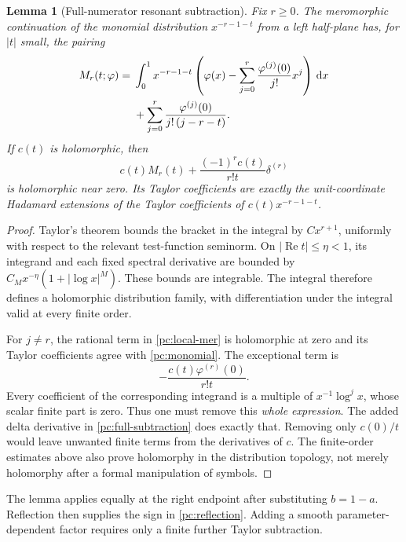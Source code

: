 \documentclass[11pt,a4paper]{article}
\numberwithin{equation}{section}
\newtheorem{lemma}[theorem]{Lemma}
\theoremstyle{definition}
\newcommand{\dd}{\,\mathrm d}
\newcommand{\Rea}{\operatorname{Re}}
\begin{document}
\begin{lemma}[Full-numerator resonant subtraction]\label{pc:local-lemma}
Fix $r\ge0$. The meromorphic continuation of the monomial distribution $x^{-r-1-t}$ from a left half-plane has, for $|t|$ small, the pairing
\begin{align}
M_r(t;\varphi)={}&\int_0^1x^{-r-1-t}
\left(\varphi(x)-\sum_{j=0}^r\frac{\varphi^{(j)}(0)}{j!}x^j\right)\dd x\notag\\
&+\sum_{j=0}^r\frac{\varphi^{(j)}(0)}{j!\,(j-r-t)}.\label{pc:local-mer}
\end{align}
If $c(t)$ is holomorphic, then
\begin{equation}\label{pc:full-subtraction}
c(t)M_r(t)+\frac{(-1)^r c(t)}{r!t}\delta^{(r)}
\end{equation}
is holomorphic near zero. Its Taylor coefficients are exactly the unit-coordinate Hadamard extensions of the Taylor coefficients of $c(t)x^{-r-1-t}$.
\end{lemma}
\begin{proof}
Taylor's theorem bounds the bracket in the integral by $C x^{r+1}$, uniformly with respect to the relevant test-function seminorm. On $|\Rea t|\le\eta<1$, its integrand and each fixed spectral derivative are bounded by $C_Mx^{-\eta}(1+|\log x|^M)$. These bounds are integrable. The integral therefore defines a holomorphic distribution family, with differentiation under the integral valid at every finite order.

For $j\ne r$, the rational term in \eqref{pc:local-mer} is holomorphic at zero and its Taylor coefficients agree with \eqref{pc:monomial}. The exceptional term is
\[
-\frac{c(t)\varphi^{(r)}(0)}{r!t}.
\]
Every coefficient of the corresponding integrand is a multiple of $x^{-1}\log^j x$, whose scalar finite part is zero. Thus one must remove this \emph{whole expression}. The added delta derivative in \eqref{pc:full-subtraction} does exactly that. Removing only $c(0)/t$ would leave unwanted finite terms from the derivatives of $c$. The finite-order estimates above also prove holomorphy in the distribution topology, not merely holomorphy after a formal manipulation of symbols.
\end{proof}
The lemma applies equally at the right endpoint after substituting $b=1-a$. Reflection then supplies the sign in \eqref{pc:reflection}. Adding a smooth parameter-dependent factor requires only a finite further Taylor subtraction.
\end{document}
